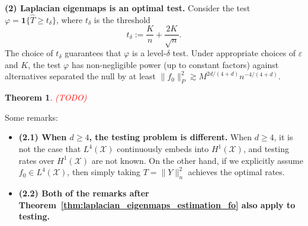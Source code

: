 \documentclass{article}
\newcommand{\1}{\mathbf{1}}
\newcommand{\Leb}{L}
\newcommand{\mc}[1]{\mathcal{#1}}
\newcommand{\wh}[1]{\widehat{#1}}
\theoremstyle{alden}
\theoremstyle{aldenthm}
\newtheorem{theorem}{Theorem}
\theoremstyle{definition}
\theoremstyle{remark}
\begin{document}
\textbf{(2) Laplacian eigenmaps is an optimal test.} Consider the test $\varphi = \1\{\wh{T} \geq t_{\delta}\}$, where $t_{\delta}$ is the threshold
\begin{equation*}
t_{\delta} := \frac{K}{n} + \frac{2K}{\sqrt{n}}.
\end{equation*}
The choice of $t_{\delta}$ guarantees that $\varphi$ is a level-$\delta$ test. Under appropriate choices of $\varepsilon$ and $K$, the test $\varphi$ has non-negligible power (up to constant factors) against alternatives separated the null by at least $\|f_0\|_{P}^2 \gtrsim M^{2d/(4 + d)}n^{-4/(4 + d)}$. 

\begin{theorem}
	\label{thm:laplacian_eigenmaps_testing_fo}
	\textcolor{red}{(TODO)}
\end{theorem}
Some remarks:
\begin{itemize}
	\item \textbf{(2.1) When $d \geq 4$, the testing problem is different.} When $d \geq 4$, it is not the case that $\Leb^4(\mc{X})$ continuously embeds into $H^1(\mc{X})$, and testing rates over $H^1(\mc{X})$ are not known. On the other hand, if we explicitly assume $f_0 \in \Leb^4(\mc{X})$, then simply taking $T = \|Y\|_n^2$ achieves the optimal rates.
	\item \textbf{(2.2) Both of the remarks after Theorem~\ref{thm:laplacian_eigenmaps_estimation_fo} also apply to testing.}
\end{itemize}
\end{document}
